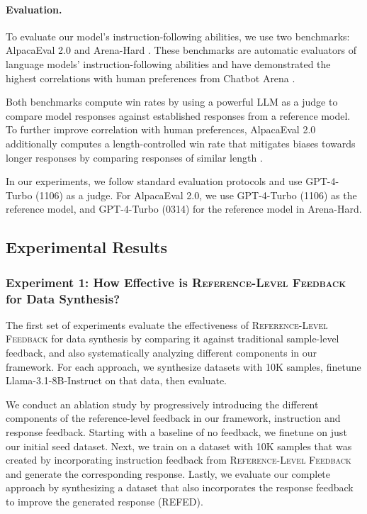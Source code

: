 \paragraph{Evaluation.}

To evaluate our model's instruction-following abilities, we use two benchmarks: AlpacaEval 2.0 \citep{dubois2024lengthcontrolledalpacaevalsimpleway} and Arena-Hard \citep{arenahard2024}. These benchmarks are automatic evaluators of language models' instruction-following abilities and have demonstrated the highest correlations with human preferences from Chatbot Arena \citep{li2024crowdsourced, dubois2024lengthcontrolledalpacaevalsimpleway}. 

Both benchmarks compute win rates by using a powerful LLM as a judge to compare model responses against established responses from a reference model. To further improve correlation with human preferences, AlpacaEval 2.0 additionally computes a length-controlled win rate that mitigates biases towards longer responses by comparing responses of similar length \citep{dubois2024lengthcontrolledalpacaevalsimpleway}.

In our experiments, we follow standard evaluation protocols and use GPT-4-Turbo (1106) as a judge. For AlpacaEval 2.0, we use GPT-4-Turbo (1106) as the reference model, and GPT-4-Turbo (0314) for the reference model in Arena-Hard.


\subsection{Experimental Results}

\subsubsection{Experiment 1: How Effective is \textsc{Reference-Level Feedback} for Data Synthesis?}

The first set of experiments evaluate the effectiveness of \textsc{Reference-Level Feedback} for data synthesis by comparing it against traditional sample-level feedback, and also systematically analyzing different components in our framework. For each approach, we synthesize datasets with 10K samples, finetune Llama-3.1-8B-Instruct on that data, then evaluate.

We conduct an ablation study by progressively introducing the different components of the reference-level feedback in our framework, instruction and response feedback. Starting with a baseline of no feedback, we finetune on just our initial seed dataset. Next, we train on a dataset with 10K samples that was created by incorporating instruction feedback from \textsc{Reference-Level Feedback} and generate the corresponding response. Lastly, we evaluate our complete approach by synthesizing a dataset that also incorporates the response feedback to improve the generated response (\textsc{REFED}).

